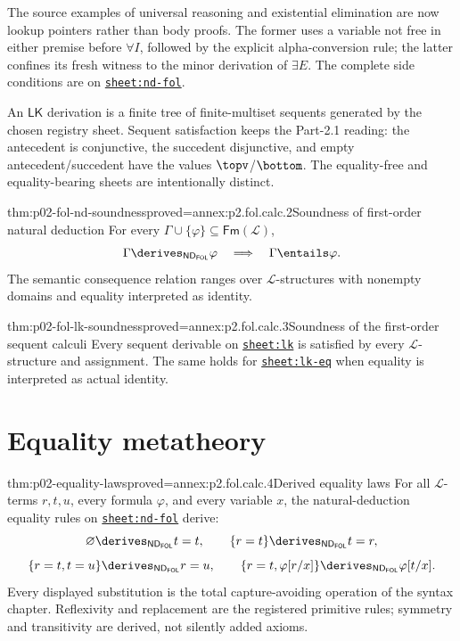 The source examples of universal reasoning and existential elimination are
now lookup pointers rather than body proofs.  The former uses a variable not
free in either premise before \(\forall I\), followed by the explicit
alpha-conversion rule; the latter confines its fresh witness to the minor
derivation of \(\exists E\).  The complete side conditions are on
\hyperref[sheet:nd-fol]{\texttt{sheet:nd-fol}}.

An \(\mathsf{LK}\) derivation is a finite tree of finite-multiset sequents
generated by the chosen registry sheet.  Sequent satisfaction keeps the
Part-2.1 reading: the antecedent is conjunctive, the succedent disjunctive,
and empty antecedent/succedent have the values \(\topv\)/\(\bottom\).
The equality-free and equality-bearing sheets are intentionally distinct.

\begin{hbtheorem}{thm:p02-fol-nd-soundness}{proved=annex:p2.fol.calc.2}{Soundness of first-order natural deduction}
For every \(\Gamma\cup\{\varphi\}\subseteq\mathsf{Fm}(\mathcal L)\),
\[
 \Gamma\derives_{\mathsf{ND}_{\mathsf{FOL}}}\varphi
 \quad\Longrightarrow\quad
 \Gamma\entails\varphi.
\]
The semantic consequence relation ranges over \(\mathcal L\)-structures with
nonempty domains and equality interpreted as identity.
\end{hbtheorem}

\begin{hbtheorem}{thm:p02-fol-lk-soundness}{proved=annex:p2.fol.calc.3}{Soundness of the first-order sequent calculi}
Every sequent derivable on \hyperref[sheet:lk]{\texttt{sheet:lk}} is
satisfied by every \(\mathcal L\)-structure and assignment.  The same holds
for \hyperref[sheet:lk-eq]{\texttt{sheet:lk-eq}} when equality is interpreted
as actual identity.
\end{hbtheorem}

\section{Equality metatheory}
\label{sec:p02-fol-equality-metatheory}

\begin{hbtheorem}{thm:p02-equality-laws}{proved=annex:p2.fol.calc.4}{Derived equality laws}
For all \(\mathcal L\)-terms \(r,t,u\), every formula \(\varphi\), and every
variable \(x\), the natural-deduction equality rules on
\hyperref[sheet:nd-fol]{\texttt{sheet:nd-fol}} derive:
\[
 \varnothing\derives_{\mathsf{ND}_{\mathsf{FOL}}}t=t,
 \qquad
 \{r=t\}\derives_{\mathsf{ND}_{\mathsf{FOL}}}t=r,
\]
\[
 \{r=t,t=u\}\derives_{\mathsf{ND}_{\mathsf{FOL}}}r=u,
 \qquad
 \{r=t,\varphi[r/x]\}
   \derives_{\mathsf{ND}_{\mathsf{FOL}}}\varphi[t/x].
\]
Every displayed substitution is the total capture-avoiding operation of the
syntax chapter.  Reflexivity and replacement are the registered primitive
rules; symmetry and transitivity are derived, not silently added axioms.
\end{hbtheorem}

